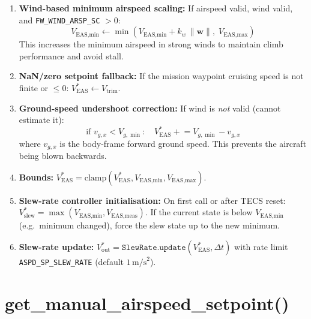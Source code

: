 \documentclass[12pt,a4paper]{article}
\begin{document}
\begin{enumerate}
  \item \textbf{Wind-based minimum airspeed scaling:}
        If airspeed valid, wind valid, and \texttt{FW\_WIND\_ARSP\_SC} $> 0$:
        \begin{equation}
          V_{\text{EAS,min}} \leftarrow \min(V_{\text{EAS,min}} +
            k_w\,\|\mathbf{w}\|,\; V_{\text{EAS,max}})
        \end{equation}
        This increases the minimum airspeed in strong winds to maintain
        climb performance and avoid stall.

  \item \textbf{NaN/zero setpoint fallback:}
        If the mission waypoint cruising speed is not finite or $\leq 0$:
        $V^*_{\text{EAS}} \leftarrow V_{\text{trim}}$.

  \item \textbf{Ground-speed undershoot correction:}
        If wind is \emph{not} valid (cannot estimate it):
        \begin{equation}
          \text{if } v_{g,x} < V_{g,\min}: \quad
          V^*_{\text{EAS}} \mathrel{+}= V_{g,\min} - v_{g,x}
        \end{equation}
        where $v_{g,x}$ is the body-frame forward ground speed. This
        prevents the aircraft being blown backwards.

  \item \textbf{Bounds:}
        $V^*_{\text{EAS}} = \text{clamp}(V^*_{\text{EAS}}, V_{\text{EAS,min}}, V_{\text{EAS,max}})$.

  \item \textbf{Slew-rate controller initialisation:}
        On first call or after TECS reset:
        $V^*_{\text{slew}} = \max(V_{\text{EAS,min}}, V_{\text{EAS,meas}})$.
        If the current state is below $V_{\text{EAS,min}}$ (e.g.\ minimum
        changed), force the slew state up to the new minimum.

  \item \textbf{Slew-rate update:}
        $V^*_{\text{out}} = \texttt{SlewRate.update}(V^*_{\text{EAS}}, \Delta t)$
        with rate limit \texttt{ASPD\_SP\_SLEW\_RATE} (default $1\,\text{m/s}^2$).
\end{enumerate}

\section{get\_manual\_airspeed\_setpoint()}
\end{document}
